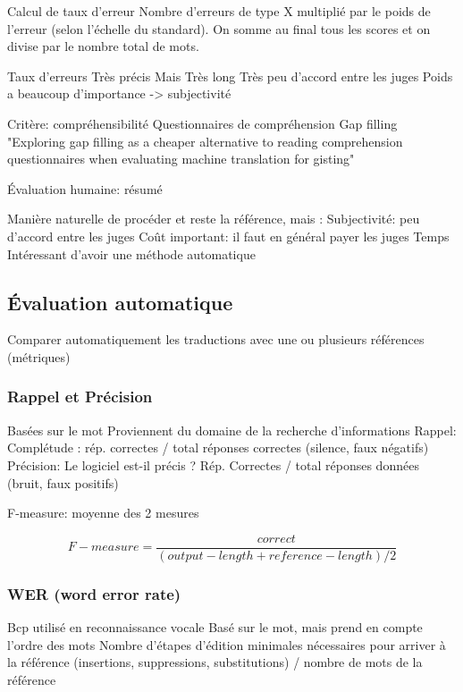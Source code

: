 Calcul de taux d'erreur
Nombre d'erreurs de type X multiplié par le poids de l'erreur (selon l'échelle du standard). On somme au final tous les scores et on divise par le nombre total de mots.

Taux d'erreurs
    Très précis
    Mais
        Très long
        Très peu d'accord entre les juges
        Poids a beaucoup d'importance -> subjectivité

Critère: compréhensibilité
    Questionnaires de compréhension
    Gap filling
    "Exploring gap filling as a cheaper alternative to reading comprehension questionnaires when evaluating machine translation for gisting"

Évaluation humaine: résumé

Manière naturelle de procéder et reste la référence, mais :
    Subjectivité: peu d'accord entre les juges
    Coût important: il faut en général payer les juges
    Temps
Intéressant d'avoir une méthode automatique

\subsection{Évaluation automatique}

Comparer automatiquement les traductions avec une ou plusieurs références (métriques)

\subsubsection{Rappel et Précision}

Basées sur le mot
Proviennent du domaine de la recherche d’informations
Rappel: Complétude : rép. correctes / total réponses correctes (silence, faux négatifs)
Précision: Le logiciel est-il précis ? Rép. Correctes / total réponses données (bruit, faux positifs)

F-measure: moyenne des 2 mesures

$$F-measure = \frac{correct}{(output-length + reference-length)/2}$$

\subsubsection{WER (word error rate)}

Bcp utilisé en reconnaissance vocale
Basé sur le mot, mais prend en compte l’ordre des mots
Nombre d’étapes d’édition minimales nécessaires pour arriver à la référence (insertions, suppressions, substitutions) / nombre de mots de la référence

